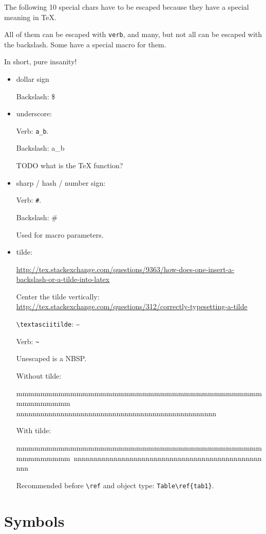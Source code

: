 \documentclass[12pt]{article}
\begin{document}
  The following 10 special chars have to be escaped because they have a special meaning in TeX.

  All of them can be escaped with \lstinline|verb|, and many, but not all can be escaped with the backslash. Some have a special macro for them.

  In short, pure insanity!

  \begin{itemize}
    \item dollar sign

      Backslash: \$

    \item underscore:

      Verb: \verb|a_b|.

      Backslash: a\_b

      TODO what is the TeX function?

    \item sharp / hash / number sign:

      Verb: \verb|#|.

      Backslash: \#

      Used for macro parameters.

    \item tilde:

      \url{http://tex.stackexchange.com/questions/9363/how-does-one-insert-a-backslash-or-a-tilde-into-latex}

      Center the tilde vertically: \url{http://tex.stackexchange.com/questions/312/correctly-typesetting-a-tilde}

      \lstinline|\textasciitilde|: \textasciitilde

      Verb: \verb|~|

      Unescaped is a NBSP.

      Without tilde:

      mmmmmmmmmmmmmmmmmmmmmmmmmmmmmmmmmmmmmmmmmmmmmmmmmm nnnnnnnnnnnnnnnnnnnnnnnnnnnnnnnnnnnnnnnnnnnnnnnnnn 

      With tilde:

      mmmmmmmmmmmmmmmmmmmmmmmmmmmmmmmmmmmmmmmmmmmmmmmmmm~nnnnnnnnnnnnnnnnnnnnnnnnnnnnnnnnnnnnnnnnnnnnnnnnnn 

      Recommended before \lstinline|\ref| and object type: \lstinline|Table\ref{tab1}|.
  \end{itemize}

\section{Symbols}\label{symbols}
\end{document}
